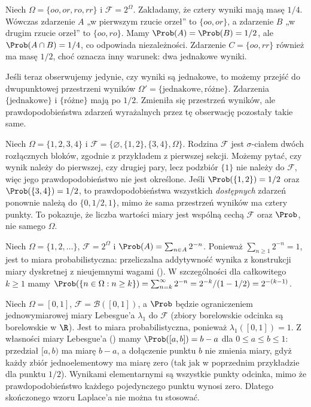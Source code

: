 \begin{przyklad}
Niech $\Omega=\{oo,or,ro,rr\}$ i $\mathcal F=2^\Omega$.
Zakładamy, że cztery wyniki mają masę $1/4$.
Wówczas zdarzenie $A$ „w pierwszym rzucie orzeł” to
$\{oo,or\}$, a zdarzenie $B$ „w drugim rzucie orzeł”
to $\{oo,ro\}$. Mamy $\Prob(A)=\Prob(B)=1/2$,
ale $\Prob(A\cap B)=1/4$, co odpowiada niezależności.
Zdarzenie $C=\{oo,rr\}$ również ma masę $1/2$,
choć oznacza inny warunek: dwa jednakowe wyniki.

Jeśli teraz obserwujemy jedynie, czy wyniki są jednakowe,
to możemy przejść do dwupunktowej przestrzeni wyników
$\Omega'=\{\text{jednakowe},\text{różne}\}$.
Zdarzenia $\{\text{jednakowe}\}$ i
$\{\text{różne}\}$ mają po $1/2$. Zmieniła się przestrzeń
wyników, ale prawdopodobieństwa zdarzeń wyrażalnych
przez tę obserwację pozostały takie same.
\end{przyklad}

\begin{przyklad}
Niech $\Omega=\{1,2,3,4\}$ i
$\mathcal F=\{\varnothing,\{1,2\},\{3,4\},\Omega\}$.
Rodzina $\mathcal F$ jest $\sigma$-ciałem dwóch rozłącznych
bloków, zgodnie z przykładem z pierwszej sekcji.
Możemy pytać, czy wynik należy do pierwszej, czy drugiej
pary, lecz podzbiór $\{1\}$ nie należy do $\mathcal F$,
więc jego prawdopodobieństwo nie jest określone.
Jeśli $\Prob(\{1,2\})=1/2$ oraz
$\Prob(\{3,4\})=1/2$, to prawdopodobieństwa wszystkich
\emph{dostępnych} zdarzeń ponownie należą do
$\{0,1/2,1\}$, mimo że sama przestrzeń wyników ma cztery
punkty. To pokazuje, że liczba wartości miary jest wspólną
cechą $\mathcal F$ oraz $\Prob$, nie samego $\Omega$.
\end{przyklad}

\begin{przyklad}
Niech $\Omega=\{1,2,\ldots\}$, $\mathcal F=2^\Omega$ i
$\Prob(A)=\sum_{n\in A}2^{-n}$. Ponieważ $\sum_{n\geq1}2^{-n}=1$,
jest to miara probabilistyczna: przeliczalna addytywność
wynika z konstrukcji miary dyskretnej z nieujemnymi wagami
().
W szczególności dla całkowitego $k\geq1$ mamy
$\Prob(\{n\in\Omega:n\geq k\})=\sum_{n=k}^\infty2^{-n}
=2^{-k}/(1-1/2)=2^{-(k-1)}$.
\end{przyklad}

\begin{przyklad}
Niech $\Omega=[0,1]$, $\mathcal F=\mathcal B([0,1])$,
a $\Prob$ będzie ograniczeniem jednowymiarowej miary Lebesgue'a
$\lambda_1$ do $\mathcal F$ (zbiory borelowskie odcinka są
borelowskie w $\R$). Jest to miara probabilistyczna, ponieważ
$\lambda_1([0,1])=1$. Z własności miary Lebesgue'a
()
mamy $\Prob([a,b])=b-a$
dla $0\leq a\leq b\leq1$: przedział $[a,b)$ ma miarę $b-a$,
a dołączenie punktu $b$ nie zmienia miary, gdyż każdy
zbiór jednoelementowy ma miarę zero (tak jak w poprzednim
przykładzie dla punktu $1/2$). Wynikami elementarnymi są wszystkie
punkty odcinka, mimo że prawdopodobieństwo każdego pojedynczego
punktu wynosi zero. Dlatego skończonego wzoru Laplace'a nie można
tu stosować.
\end{przyklad}

